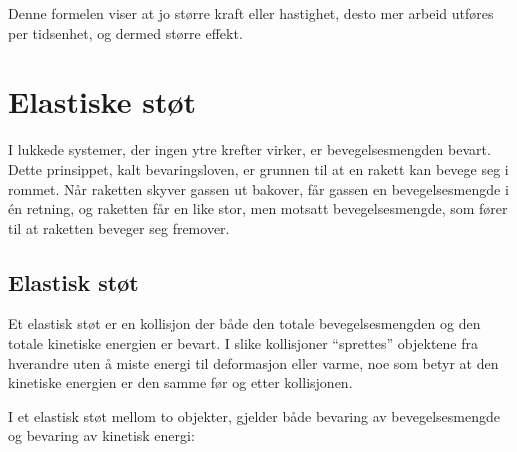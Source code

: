 Denne formelen viser at jo større kraft eller hastighet, desto mer arbeid utføres per tidsenhet, og dermed større effekt.


\section{Elastiske støt}
I lukkede systemer, der ingen ytre krefter virker, er bevegelsesmengden bevart. Dette prinsippet, kalt bevaringsloven, er grunnen til at en rakett kan bevege seg i rommet. Når raketten skyver gassen ut bakover, får gassen en bevegelsesmengde i én retning, og raketten får en like stor, men motsatt bevegelsesmengde, som fører til at raketten beveger seg fremover.


\subsection{Elastisk støt}

Et elastisk støt er en kollisjon der både den totale bevegelsesmengden og den totale kinetiske energien er bevart. I slike kollisjoner ``sprettes''
 objektene fra hverandre uten å miste energi til deformasjon eller varme, noe som betyr at den kinetiske energien er den samme før og etter kollisjonen.

I et elastisk støt mellom to objekter, gjelder både bevaring av bevegelsesmengde og bevaring av kinetisk energi:


